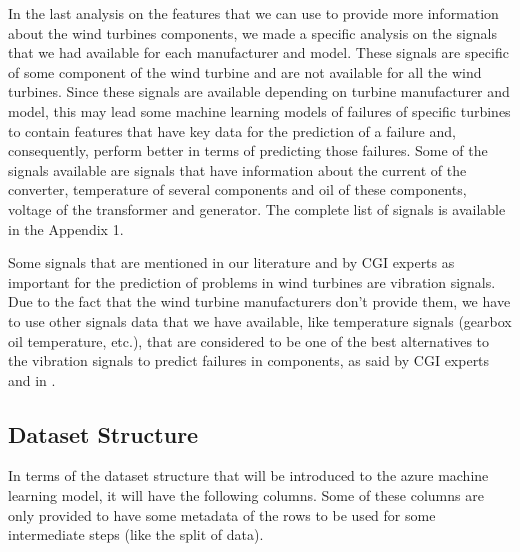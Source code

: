 In the last analysis on the features that we can use to provide more information about the wind turbines components, we made a specific analysis on the signals that we had available for each manufacturer and model. These signals are specific of some component of the wind turbine and are not available for all the wind turbines.
Since these signals are available depending on turbine manufacturer and model, this may lead some machine learning models of failures of specific turbines to contain features that have key data for the prediction of a failure and, consequently, perform better in terms of predicting those failures.
Some of the signals available are signals that have information about the current of the converter, temperature of several components and oil of these components, voltage of the transformer and generator. The complete list of signals is available in the Appendix 1.

Some signals that are mentioned in our literature and by CGI experts as important for the prediction of problems in wind turbines are vibration signals. Due to the fact that the wind turbine manufacturers don't provide them, we have to use other signals data that we have available, like temperature signals (gearbox oil temperature, etc.), that are considered to be one of the best alternatives to the vibration signals to predict failures in components, as said by CGI experts and in \cite{OLD_19_WIND}.


\subsection{Dataset Structure} 
\label{sub:if_you_use_this_template} 

In terms of the dataset structure that will be introduced to the azure machine learning model, it will have the following columns. Some of these columns are only provided to have some metadata of the rows to be used for some intermediate steps (like the split of data).

